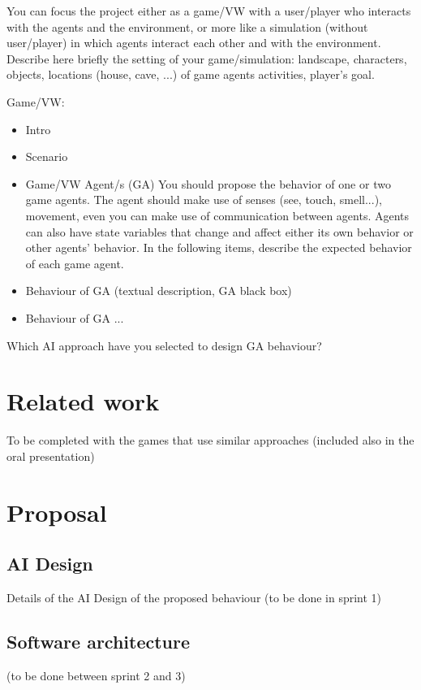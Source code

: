 \documentclass[preprint,12pt]{elsarticle}
\begin{document}
You can focus the project either as a game/VW  with a user/player who interacts with the agents and the environment, or more like a simulation (without user/player) in which agents interact each other and with the environment. Describe here briefly the setting of your game/simulation: landscape, characters, objects, locations (house, cave, ...) of game agents activities, player's goal.

Game/VW:
\begin{itemize}
\item Intro
\item Scenario
\item Game/VW Agent/s (GA)
You should propose the behavior of one or two game agents. The agent should make use of senses (see, touch, smell...), movement, even you can make use of communication between agents. Agents can also have state variables that change and affect either its own behavior or other agents' behavior. In the following items, describe the expected behavior of each game agent.
\item Behaviour of GA (textual description, GA black box)
\item Behaviour of GA ... 
\end{itemize}

Which AI approach have you selected to design GA behaviour?

\section{Related work}

To be completed with the games that use similar approaches (included also in the oral presentation)


\section{Proposal}

\subsection {AI Design}

Details of the AI Design of the proposed behaviour (to be done in sprint 1) 

\subsection{Software architecture}

(to be done between sprint 2 and 3)
\end{document}
